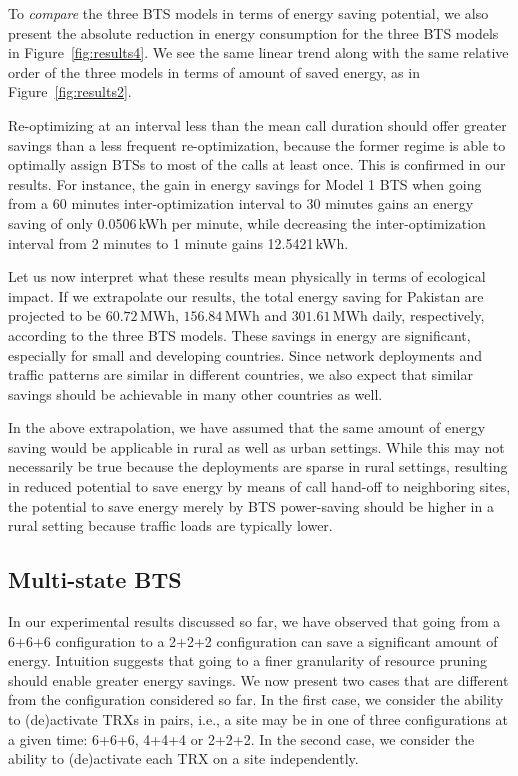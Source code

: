 To \textit{compare} the three BTS models in terms of energy saving potential, we also present the absolute reduction in energy consumption for the three BTS models in Figure~\ref{fig:results4}. We see the same linear trend along with the same relative order of the three models in terms of amount of saved energy, as in Figure~\ref{fig:results2}.

Re-optimizing at an interval less than the mean call duration should offer greater savings than a less frequent re-optimization, because the former regime is able to optimally assign BTSs to most of the calls at least once. This is confirmed in our results. For instance, the gain in energy savings for Model 1 BTS when going from a 60 minutes inter-optimization interval to 30 minutes gains an energy saving of only 0.0506\,kWh per minute, while decreasing the inter-optimization interval from 2 minutes to 1 minute gains 12.5421\,kWh.

Let us now interpret what these results mean physically in terms of ecological impact. If we extrapolate our results, the total energy saving for Pakistan are projected to be $60.72$\,MWh, $156.84$\,MWh and $301.61$\,MWh daily, respectively, according to the three BTS models. These savings in energy are significant, especially for small and developing countries. Since network deployments and traffic patterns are similar in different countries, we also expect that similar savings should be achievable in many other countries as well.

In the above extrapolation, we have assumed that the same amount of energy saving would be applicable in rural as well as urban settings. While this may not necessarily be true because the deployments are sparse in rural settings, resulting in reduced potential to save energy by means of call hand-off to neighboring sites, the potential to save energy merely by BTS power-saving should be higher in a rural setting because traffic loads are typically lower.

\subsection{Multi-state BTS}
\label{subsec:results2}
In our experimental results discussed so far, we have observed that going from a 6+6+6 configuration to a 2+2+2 configuration can save a significant amount of energy. Intuition suggests that going to a finer granularity of resource pruning should enable greater energy savings. We now present two cases that are different from the configuration considered so far. In the first case, we consider the ability to (de)activate TRXs in pairs, i.e., a site may be in one of three configurations at a given time: 6+6+6, 4+4+4 or 2+2+2. In the second case, we consider the ability to (de)activate each TRX on a site independently.

